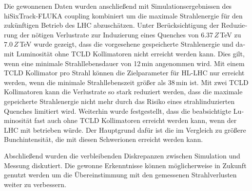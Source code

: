 \begin{otherlanguage}{german}
Die gewonnenen Daten wurden anschlie\ss end mit Simulationsergebnissen des hiSixTrack-FLUKA coupling kombiniert um die maximale Strahlenergie f\"{u}r den zuk\"{u}nftigen Betrieb des LHC abzusch\"{a}tzen. Unter Ber\"{u}cksichtigung der Reduzierung der n\"{o}tigen Verlustrate zur Induzierung eines Quenches von 6.37$\,Z\,$TeV zu $7.0\,Z\,$TeV wurde gezeigt, dass die vorgesehene gespeicherte Strahlenergie und damit Luminosit\"{a}t ohne TCLD Kollimatoren nicht erreicht werden kann. Dies gilt, wenn eine \mbox{minimale} Strahllebensdauer von 12\,min angenommen wird. Mit einem TCLD Kollimator pro Strahl k\"{o}nnen die Zielparameter f\"{u}r HL-LHC nur erreicht werden, wenn die \mbox{minimale} Strahllebenszeit gr\"{o}\ss er als 38$\,$min ist. Mit zwei TCLD Kollimatoren kann die \mbox{Verlustrate} so stark reduziert werden, dass die maximale gepeicherte Strahlenergie nicht mehr durch das Risiko eines strahlinduzierten Quenches limitiert wird. Weiterhin wurde festgestellt, dass die beabsichtigte Luminosit\"{a}t fast auch ohne TCLD Kollimatoren erreicht werden kann, wenn der LHC mit  betrieben w\"{u}rde. Der Hauptgrund daf\"{u}r ist die im Vergleich zu \lead gr\"{o}\ss ere Bunchintensit\"{a}t, die mit diesen Schwerionen erreicht werden kann.
\vspace{0.2cm}

Abschlie\ss end wurden die verbleibenden Diskrepanzen zwischen Simulation und Messung diskutiert. Die gewonne Erkenntnisse k\"{o}nnen m\"{o}glicherweise in Zukunft genutzt werden um die \"{U}bereinstimmung mit den gemessenen Strahlverlusten weiter zu verbessern. %
\vspace{0.2cm}


\end{otherlanguage}
